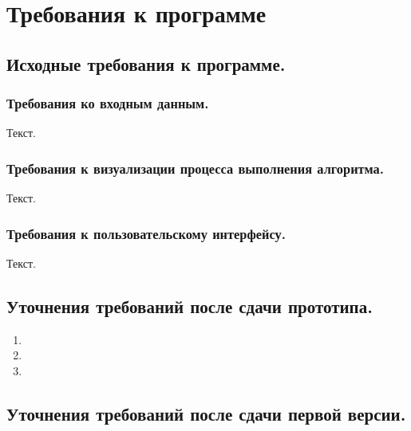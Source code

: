 

\newcommand{\teacher}{Преподавателев~П.П.}
\newcommand{\theme}{Наименование темы}
\newcommand{\firstmember}{Иванов~И.И.}
\newcommand{\secondmember}{Петров~П.П.}
\newcommand{\thirdmember}{Сидоров~С.С.}
\newcommand{\groupnumber}{0000}
\newcommand{\group}{Группа 0000}





\setcounter{page}{2}



\section{Требования к программе}

\subsection{Исходные требования к программе.}

\subsubsection{Требования ко входным данным.}

Текст.

\subsubsection{Требования к визуализации процесса выполнения алгоритма.}

Текст.

\subsubsection{Требования к пользовательскому интерфейсу.}

Текст.

\subsection{Уточнения требований после сдачи прототипа.}

\begin{enumerate}
	\item
	\item 
	\item 
\end{enumerate}

\subsection{Уточнения требований после сдачи первой версии.}

